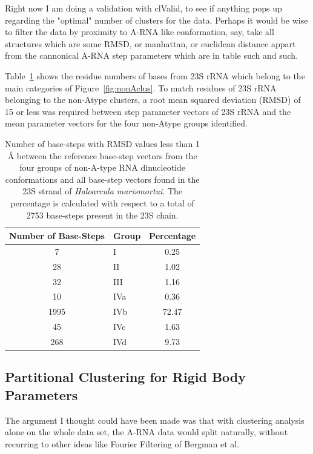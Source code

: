 Right now I am doing a validation with clValid, to see if anything
pops up regarding the "optimal" number of clusters for the data.
Perhaps it would be wise to filter the data by proximity to A-RNA like
conformation, say, take all structures which are some RMSD, or
manhattan, or euclidean distance appart from the cannonical A-RNA step
parameters which are in table such and such.


Table~\ref{tab:nonA}  shows  the
residue  numbers of  bases  from 23S  rRNA  which belong  to the  main
categories of Figure~\ref{fig:nonAclus}.   To match residues of
23S  rRNA belonging  to the  non-Atype  clusters, a  root mean  squared
deviation (RMSD)  of 15  or less was  required between  step parameter
vectors  of 23S  rRNA  and the  mean  parameter vectors  for the  four
non-Atype groups identified.
\begin{table}[htbp]
\begin{center}
{\footnotesize
\begin{tabular}{c|p{}|c}
\hline
\bf{Number of Base-Steps} & \bf{Group} & \bf{Percentage}\\ \hline
7    & I   & 0.25   \\ \hline
28   & II  & 1.02   \\ \hline
32   & III & 1.16   \\ \hline
10   & IVa & 0.36   \\ \hline
1995 & IVb & 72.47  \\ \hline
45   & IVc & 1.63   \\ \hline
268  & IVd & 9.73   \\ \hline
\end{tabular}
}
\caption{Number of base-steps  with RMSD values less than 1 \AA
between  the  reference base-step vectors  from  the  four groups  of
non-A-type  RNA dinucleotide conformations  and all  base-step vectors
found  in  the 23S  strand  of  \textit{Haloarcula marismortui}. The percentage is calculated with respect to a
total of 2753 base-steps present in the 23S chain.}
\label{tab:nonA}
\end{center}
\end{table}



%
%


\subsection{Partitional Clustering for Rigid Body Parameters}
The argument I thought could have been made was that with clustering
analysis alone on the whole data set, the A-RNA data would split
naturally, without recurring to other ideas like Fourier Filtering of
Bergman et al.

